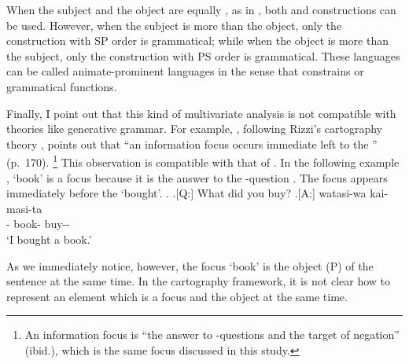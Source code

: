 When the subject and the object are equally , as in \Last,
both  and  constructions can be used.
However,
when the subject is more  than the object,
only the construction with SP order is grammatical;
while when the object is more  than the subject,
only the  construction with PS order is grammatical.
These languages can be called animate-prominent languages
in the sense that
 constrains  or grammatical functions.



Finally, I point out that this kind of multivariate analysis
is not compatible with theories like generative grammar.
For example,
, following Rizzi's cartography theory \cite[e.g.,][]{rizzi97,rizzi04},
points out that ``an information focus occurs immediate left to the '' (p.~170).%
 \footnote{
 An information focus is ``the answer to -questions and the target of negation'' (ibid.),
 which is the same focus discussed in this study.
 }
This observation is compatible with that of .
In the following example \Next[A],
 `book' is a focus because it is the answer to the -question \Next[Q].
The focus appears immediately before the   `bought'.
%
\ex.
 \a.[Q:] What did you buy?
 \bg.[A:] watasi-wa  kai-masi-ta \\
          - book- buy-- \\
          `I bought a book.'
  \hfill{\cite[170--171]{endo14}}

As we immediately notice, however,
the focus  `book' is the object (P) of the sentence at the same time.
In the cartography framework,
it is not clear how to represent an element which is a focus and the object
at the same time.




